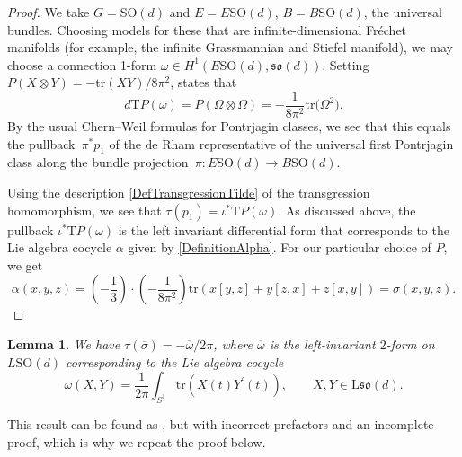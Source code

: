 \documentclass[pdftex]{sigma}
\numberwithin{equation}{section}
\newtheorem{Lemma}[Theorem]{Lemma}
\newcommand{\tr}{\mathrm{tr}}
\newcommand{\SO}{\mathrm{SO}}
\renewcommand{\L}{\mathrm{L}}
\begin{document}
\begin{proof}
We take $G = \SO(d)$ and $E = E\SO(d)$, $B = B\SO(d)$, the universal bundles.
Choosing models for these that are infinite-dimensional Fr\'echet manifolds (for example, the infinite Grassmannian and Stiefel manifold), we may choose a connection 1-form $\omega \in H^1(E\SO(d), \mathfrak{so}(d))$.
Setting $P(X \otimes Y) = -\tr(XY)/8\pi^2$, \cite[Proposition~3.2]{ChernSimons} states that
\begin{equation*}
 d \mathrm{T}P(\omega) = P(\Omega \otimes \Omega) = -\frac{1}{8\pi^2}\tr\big(\Omega^2\big).
\end{equation*}
By the usual Chern--Weil formulas for Pontrjagin classes, we see that this equals the pullback~$\pi^*p_1$ of the de Rham representative of the universal first Pontrjagin class along the bundle projection~$\pi\colon E\SO(d) \to B\SO(d)$.

Using the description \eqref{DefTransgressionTilde} of the transgression homomorphism, we see that $\tilde{\tau}(p_1) = \iota^*\mathrm{T}P(\omega)$.
As discussed above, the pullback $\iota^*\mathrm{T}P(\omega)$ is the left invariant differential form that corresponds to the Lie algebra cocycle $\alpha$ given by \eqref{DefinitionAlpha}.
For our particular choice of $P$, we get
\[
\alpha(x, y, z) = \left(-\frac{1}{3}\right) \cdot\left(-\frac{1}{8\pi^2}\right) \tr(x [y, z] + y [z, x] + z [x, y])
= \sigma(x, y, z).\tag*{\qed}
\]\renewcommand{\qed}{}
\end{proof}



\begin{Lemma}
\label{LemmaA3}
We have $\tau(\overline{\sigma}) = -\overline{\omega}/2 \pi$, where $\overline{\omega}$ is the left-invariant $2$-form on $L\SO(d)$ corresponding to the Lie algebra cocycle
\begin{equation*}
 \omega(X, Y) = \frac{1}{2\pi}\int_{S^1} \tr(X(t)Y^\prime(t)), \qquad X, Y \in \L\mathfrak{so}(d).	
\end{equation*}
\end{Lemma}

This result can be found as \cite[Proposition~4.4.4]{PressleySegal}, but with incorrect prefactors and an incomplete proof, which is why we repeat the proof below.
\end{document}
